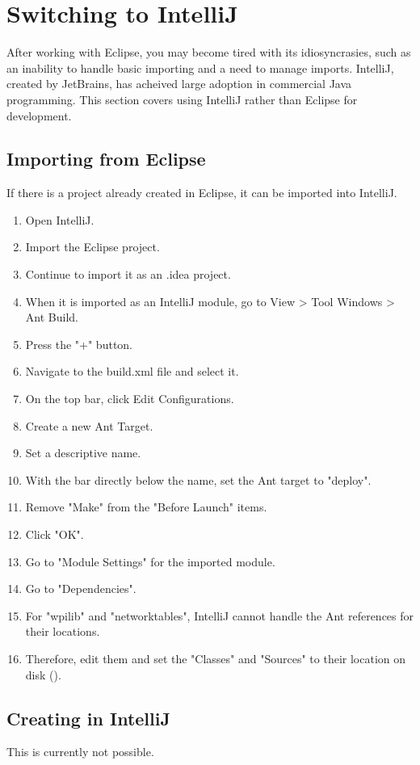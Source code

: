 \documentclass[]{report}
\begin{document}
\section{Switching to IntelliJ}
After working with Eclipse, you may become tired with its idiosyncrasies, such as an inability to handle basic importing and a need to manage imports.
IntelliJ, created by JetBrains, has acheived large adoption in commercial Java programming.
This section covers using IntelliJ rather than Eclipse for development.

\subsection{Importing from Eclipse}
If there is a project already created in Eclipse, it can be imported into IntelliJ.
\begin{enumerate}
\item Open IntelliJ.
\item Import the Eclipse project.
\item Continue to import it as an .idea project.
\item When it is imported as an IntelliJ module, go to View \textgreater{} Tool Windows \textgreater{} Ant Build.
\item Press the "+" button.
\item Navigate to the build.xml file and select it.
\item On the top bar, click Edit Configurations.
\item Create a new Ant Target.
\item Set a descriptive name.
\item With the bar directly below the name, set the Ant target to "deploy".
\item Remove "Make" from the "Before Launch" items.
\item Click "OK".
\item Go to "Module Settings" for the imported module.
\item Go to "Dependencies".
\item For "wpilib" and "networktables", IntelliJ cannot handle the Ant references for their locations.
\item Therefore, edit them and set the "Classes" and "Sources" to their location on disk ().
\end{enumerate}


\subsection{Creating in IntelliJ}
This is currently not possible.
\end{document}
